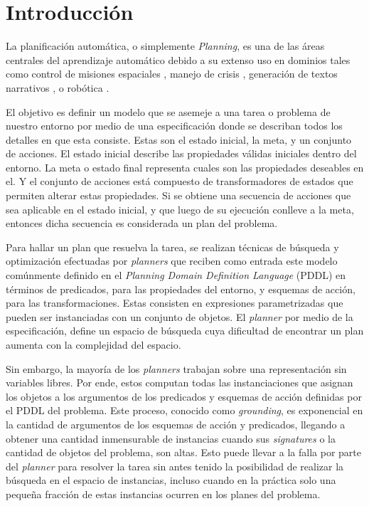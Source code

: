 \chapter{Introducción}
\label{ch:into} %

La planificación automática, o simplemente \emph{Planning}, es una de las áreas centrales del aprendizaje automático debido a su extenso uso en dominios tales como control de misiones espaciales \citep{RabideauG-et-al-2001}, manejo de crisis \citep{Bienkowki-1995}, generación de textos narrativos \citep{Goudoulakis-et-al-2016}, o robótica \citep{Munoz-et-al-2016}.

El objetivo es definir un modelo que se asemeje a una tarea o problema de nuestro entorno por medio de una
especificación donde se describan todos los detalles en que esta consiste. Estas son el estado inicial, la meta, y un conjunto de acciones. El estado inicial describe las propiedades válidas iniciales dentro del entorno. La meta o estado final representa cuales son las propiedades deseables en el. Y el conjunto de acciones está
compuesto de transformadores de estados que permiten alterar estas propiedades. Si se obtiene una secuencia de acciones que sea aplicable en el estado inicial, y que luego de su ejecución conlleve a la meta, entonces dicha secuencia es considerada un plan del problema. \citep{Georgievski-et-al-2016}

Para hallar un plan que resuelva la tarea, se realizan técnicas de búsqueda y optimización efectuadas por \emph{planners} que reciben como entrada este modelo comúnmente definido en el \emph{Planning Domain Definition Language} (PDDL) en términos de predicados, para las propiedades del entorno, y esquemas de acción, para las transformaciones. Estas consisten en expresiones parametrizadas que pueden ser instanciadas con un conjunto de objetos. El \emph{planner} por medio de la especificación, define un espacio de búsqueda cuya dificultad de encontrar un plan aumenta con la complejidad del espacio. \citep{Georgievski-et-al-2016}

Sin embargo, la mayoría de los \emph{planners} trabajan sobre una representación sin variables libres. Por ende, estos computan todas las instanciaciones que asignan los objetos a los argumentos de los predicados y esquemas de acción definidas por el PDDL del problema. Este proceso, conocido como \emph{grounding}, es exponencial en la cantidad de argumentos de los esquemas de acción y predicados, llegando a obtener una cantidad inmensurable de instancias cuando sus \emph{signatures} o la cantidad de objetos del problema, son altas. Esto puede llevar a la falla por parte del \emph{planner} para resolver la tarea sin antes tenido la posibilidad de realizar la búsqueda en el espacio de instancias, incluso cuando en la práctica solo una pequeña fracción de estas instancias ocurren en los planes del problema. \citep{Gnad_Torralba_Dominguez_Areces_Bustos_2019}

